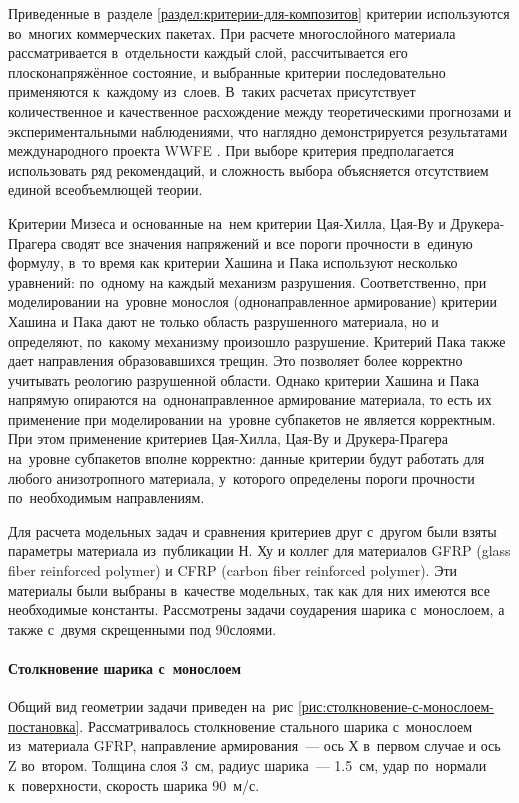 \documentclass[thesis.tex]{subfiles}
\begin{document}
Приведенные в~разделе \ref{раздел:критерии-для-композитов} критерии используются во~многих коммерческих пакетах. При
расчете многослойного материала рассматривается в~отдельности каждый слой, рассчитывается его плосконапряжённое
состояние, и выбранные критерии последовательно применяются к~каждому из~слоев. В~таких расчетах
присутствует количественное и качественное расхождение между теоретическими прогнозами и экспериментальными
наблюдениями, что наглядно демонстрируется результатами международного проекта WWFE \cite{kaddour2013maturity}. При
выборе критерия предполагается использовать ряд рекомендаций, и сложность выбора объясняется отсутствием единой
всеобъемлющей теории.

Критерии Мизеса и основанные на~нем критерии Цая-Хилла, Цая-Ву и Друкера-Прагера сводят все значения напряжений и все
пороги прочности в~единую формулу, в~то время как критерии Хашина и Пака используют несколько уравнений: по~одному на
каждый механизм разрушения. Соответственно, при моделировании на~уровне монослоя (однонаправленное армирование) критерии
Хашина и Пака дают не только область разрушенного материала, но и определяют, по~какому механизму произошло разрушение.
Критерий Пака также дает направления образовавшихся трещин. Это позволяет более корректно учитывать реологию разрушенной
области. Однако критерии Хашина и Пака напрямую опираются на~однонаправленное армирование материала, то есть их
применение при моделировании на~уровне субпакетов не является корректным. При этом применение критериев Цая-Хилла, Цая-Ву
и Друкера-Прагера на~уровне субпакетов вполне корректно: данные критерии будут работать для любого анизотропного
материала, у~которого определены пороги прочности по~необходимым направлениям.

Для расчета модельных задач и сравнения критериев друг с~другом были взяты параметры материала из~публикации Н. Ху и
коллег \cite{hu2007stable} для материалов GFRP (glass fiber reinforced polymer) и CFRP (carbon fiber reinforced
polymer). Эти материалы были выбраны в~качестве модельных, так как для них имеются все необходимые константы.
Рассмотрены задачи соударения шарика с~монослоем, а также с~двумя скрещенными под 90\degree слоями.

\paragraph{Столкновение шарика с~монослоем}

Общий вид геометрии задачи приведен на~рис \ref{рис:столкновение-с-монослоем-постановка}. Рассматривалось столкновение
стального шарика с~монослоем из~материала GFRP, направление армирования~--- ось Х в~первом случае и ось Z во~втором.
Толщина слоя 3~см, радиус шарика~--- 1.5~см, удар по~нормали к~поверхности, скорость шарика 90~м/с.
\end{document}
